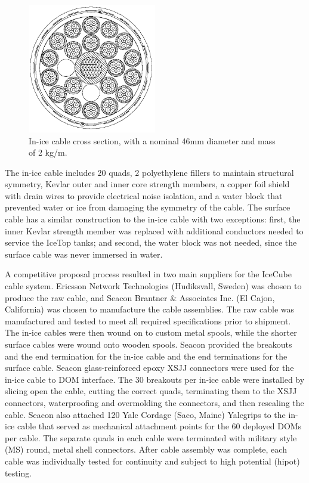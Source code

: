 \begin{figure}
  \centering
  \includegraphics[width=0.5\textwidth]{graphics/cables/cable_xsection.png}
  \caption{\label{fig:cable_xsection}In-ice cable cross
    section, with a nominal 46mm diameter and mass of 2 kg/m.} 
\end{figure}

The in-ice cable includes 20 quads, 2 polyethylene fillers to maintain structural
symmetry, Kevlar outer and inner core strength members, a copper foil
shield with drain wires to provide electrical noise isolation, and a water
block that prevented water or ice from damaging the symmetry of the
cable. The surface cable has a similar construction to the in-ice
cable with two exceptions: first, the inner Kevlar strength member was replaced
with additional conductors needed to service the IceTop tanks; and second, the
water block was not needed, since the surface cable was never immersed in
water.  

A competitive proposal process resulted in two main suppliers for the IceCube
cable system.  Ericsson Network Technologies (Hudiksvall, Sweden) was chosen
to produce the raw cable, and Seacon Brantner \& Associates Inc. (El Cajon,
California) was chosen to manufacture the cable assemblies. The raw
cable was manufactured and tested to meet all required specifications prior
to shipment.  The in-ice cables were then
wound on to custom metal spools, while the shorter surface cables were wound
onto wooden spools. Seacon provided the breakouts
and the end termination for the in-ice cable and the end
terminations for the surface cable. Seacon glass-reinforced epoxy XSJJ
connectors were used for the in-ice
cable to DOM interface. The 30 breakouts per in-ice cable were installed by
slicing open the cable, cutting the correct quads, terminating them to the
XSJJ connectors, waterproofing and overmolding the connectors, and then
resealing the cable. Seacon also
attached 120 Yale Cordage (Saco, Maine) Yalegrips to the in-ice
cable that served as mechanical attachment points for the 60 deployed DOMs
per cable. The separate quads in each cable were terminated with military
style (MS) round, metal shell connectors. After cable assembly was complete,
each cable was individually tested for continuity and subject to high
potential (hipot) testing. 

